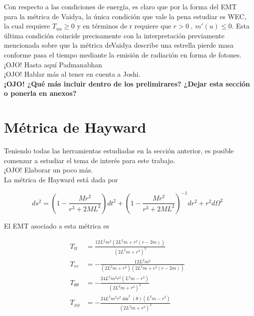 \documentclass{article}
\numberwithin{equation}{section}
\begin{document}
Con respecto a las condiciones de energía, es claro que por la forma del EMT para la métrica de Vaidya, la única condición que vale la pena estudiar es WEC, la cual requiere $T_{uu} \geq 0$ y en términos de r requiere que $r > 0\ ,\ m'(u)\leq 0 $. Esta última condición coincide precisamente con la interpretación previamente mencionada sobre que la métrica deVaidya describe una estrella pierde masa conforme pasa el tiempo mediante la emisión de radiación en forma de fotones.\\

¡OJO! Hasta aquí Padmanabhan\\

¡OJO! Hablar más al tener en cuenta a Joshi.\\

\textbf{¡OJO! ¿Qué más incluir dentro de los prelimirares? ¿Dejar esta sección o ponerla en anexos?}\\

\section{Métrica de Hayward}

Teniendo todas las herramientas estudiadas en la sección anterior, es posible comenzar a estudiar el tema de interés para este trabajo.\\

¡OJO! Elaborar un poco más.\\

La métrica de Hayward está dada por 

\begin{equation}
ds^2 = \left( 1 - \frac{Mr^2}{r^3 + 2ML^2} \right) dt^2 + \left( 1 - \frac{Mr^2}{r^3 + 2ML^2} \right)^{-1} dr^2 + r^2d\Omega ^2
\end{equation}

El EMT asociado a esta métrica es

\begin{equation}
\begin{split}
T_{tt} &= \frac{12 L^2 m^2 \left(2 L^2 m+r^2 (r-2 m)\right)}{\left(2 L^2 m+r^3\right)^3}\\
T_{rr} &= -\frac{12 L^2 m^2}{\left(2 L^2 m+r^3\right) \left(2 L^2 m+r^2 (r-2 m)\right)}\\
T_{\theta \theta} &= -\frac{24 L^2 m^2 r^2 \left(L^2 m-r^3\right)}{\left(2 L^2 m+r^3\right)^3}\\
T_{\phi \phi} &= -\frac{24 L^2 m^2 r^2 \sin ^2(\theta ) \left(L^2 m-r^3\right)}{\left(2 L^2 m+r^3\right)^3}
\end{split}
\end{equation}
\end{document}
